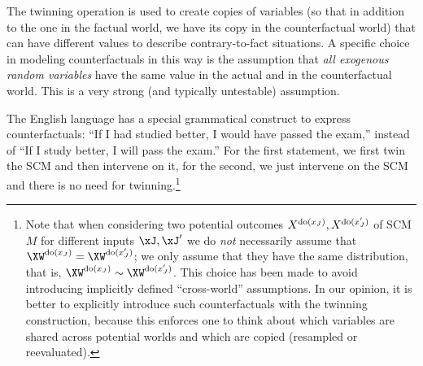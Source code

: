 The twinning operation is used to create copies of variables (so that in addition to the one in the factual world, 
we have its copy in the counterfactual world) that can have different values to describe contrary-to-fact situations.
A specific choice in modeling counterfactuals in this way is the assumption that \emph{all exogenous random variables}
have the same value in the actual and in the counterfactual world. This is a very strong (and typically untestable)
assumption.

The English language has a special grammatical construct to express counterfactuals:
``If I had studied better, I would have passed the exam,'' instead of ``If I study better, I will pass the exam.''
For the first statement, we first twin the SCM and then intervene on it, for the second, we just intervene on the SCM and there is no need for twinning.\footnote{Note 
that when considering two potential outcomes $X^{\operatorname{do}(x_J)},X^{\operatorname{do}(x_J')}$ of SCM $M$ for different inputs $\xJ, \xJ'$ we do \emph{not} necessarily assume that $\XW^{\doit(x_J)} = \XW^{\doit(x_J')}$; 
we only assume that they have the same distribution, that is, $\XW^{\doit(x_J)} \sim \XW^{\doit(x_J')}$. 
This choice has been made to avoid introducing implicitly defined ``cross-world'' assumptions.
In our opinion, it is better to explicitly introduce such counterfactuals with the twinning construction, because this enforces one to think about which variables are shared across potential worlds and which are copied (resampled or reevaluated).}

